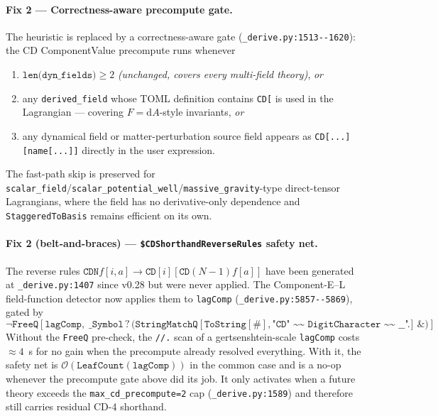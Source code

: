 \paragraph{Fix 2 --- Correctness-aware precompute gate.} The heuristic is replaced by a correctness-aware gate (\verb|_derive.py:1513--1620|): the CD ComponentValue precompute runs whenever
\begin{enumerate}
  \item $\texttt{len(dyn\_fields)} \ge 2$ \emph{(unchanged, covers every multi-field theory)}, \emph{or}
  \item any \texttt{derived\_field} whose TOML definition contains \texttt{CD[} is used in the Lagrangian --- covering $F = \mathrm{d}A$-style invariants, \emph{or}
  \item any dynamical field or matter-perturbation source field appears as \verb|CD[...][name[...]]| directly in the user expression.
\end{enumerate}
The fast-path skip is preserved for \verb|scalar_field|/\verb|scalar_potential_well|/\verb|massive_gravity|-type direct-tensor Lagrangians, where the field has no derivative-only dependence and \verb|StaggeredToBasis| remains efficient on its own.

\paragraph{Fix 2 (belt-and-braces) --- \texttt{\$CDShorthandReverseRules} safety net.} The reverse rules $\texttt{CDN}f[i, a] \to \texttt{CD}[i][\texttt{CD}(N{-}1)f[a]]$ have been generated at \verb|_derive.py:1407| since v0.28 but were never applied. The Component-E--L field-function detector now applies them to \verb|lagComp| (\verb|_derive.py:5857--5869|), gated by
\begin{equation*}
  \neg \texttt{FreeQ}\!\left[\texttt{lagComp},\; \texttt{\_Symbol}\!\mathbin{?}\!\bigl(\texttt{StringMatchQ}[\texttt{ToString}[\#], \texttt{"CD" \textasciitilde\textasciitilde\ DigitCharacter \textasciitilde\textasciitilde\ \_\_"}]\,\&\bigr)\right].
\end{equation*}
Without the \verb|FreeQ| pre-check, the \verb|//.| scan of a gertsenshtein-scale \verb|lagComp| costs $\approx 4$~s for no gain when the precompute already resolved everything. With it, the safety net is $\mathcal{O}(\texttt{LeafCount}(\texttt{lagComp}))$ in the common case and is a no-op whenever the precompute gate above did its job. It only activates when a future theory exceeds the \verb|max_cd_precompute=2| cap (\verb|_derive.py:1589|) and therefore still carries residual CD-4 shorthand.

